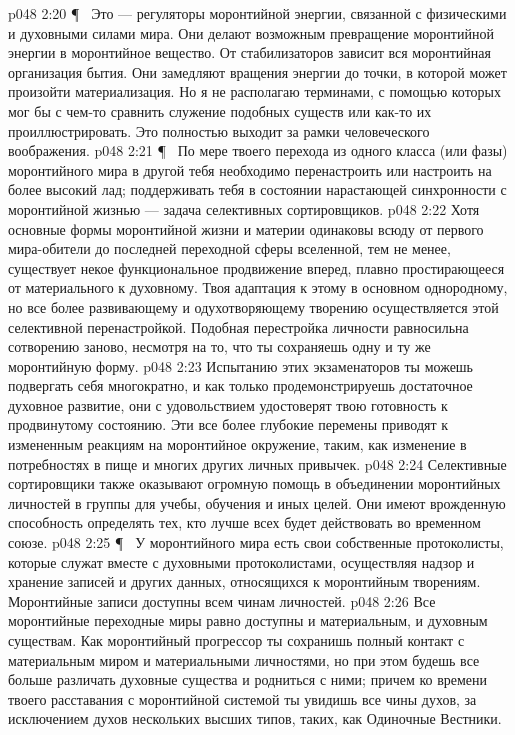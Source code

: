 \vs p048 2:20 \P\ \bibnobreakspace {} Это --- регуляторы моронтийной энергии, связанной с физическими и духовными силами мира. Они делают возможным превращение моронтийной энергии в моронтийное вещество. От стабилизаторов зависит вся моронтийная организация бытия. Они замедляют вращения энергии до точки, в которой может произойти материализация. Но я не располагаю терминами, с помощью которых мог бы с чем\hyp{}то сравнить служение подобных существ или как\hyp{}то их проиллюстрировать. Это полностью выходит за рамки человеческого воображения.
\vs p048 2:21 \P\ \bibnobreakspace {} По мере твоего перехода из одного класса (или фазы) моронтийного мира в другой тебя необходимо перенастроить или настроить на более высокий лад; поддерживать тебя в состоянии нарастающей синхронности с моронтийной жизнью --- задача селективных сортировщиков.
\vs p048 2:22 Хотя основные формы моронтийной жизни и материи одинаковы всюду от первого мира\hyp{}обители до последней переходной сферы вселенной, тем не менее, существует некое функциональное продвижение вперед, плавно простирающееся от материального к духовному. Твоя адаптация к этому в основном однородному, но все более развивающему и одухотворяющему творению осуществляется этой селективной перенастройкой. Подобная перестройка личности равносильна сотворению заново, несмотря на то, что ты сохраняешь одну и ту же моронтийную форму.
\vs p048 2:23 Испытанию этих экзаменаторов ты можешь подвергать себя многократно, и как только продемонстрируешь достаточное духовное развитие, они с удовольствием удостоверят твою готовность к продвинутому состоянию. Эти все более глубокие перемены приводят к измененным реакциям на моронтийное окружение, таким, как изменение в потребностях в пище и многих других личных привычек.
\vs p048 2:24 Селективные сортировщики также оказывают огромную помощь в объединении моронтийных личностей в группы для учебы, обучения и иных целей. Они имеют врожденную способность определять тех, кто лучше всех будет действовать во временном союзе.
\vs p048 2:25 \P\ \bibnobreakspace {} У моронтийного мира есть свои собственные протоколисты, которые служат вместе с духовными протоколистами, осуществляя надзор и хранение записей и других данных, относящихся к моронтийным творениям. Моронтийные записи доступны всем чинам личностей.
\vs p048 2:26 Все моронтийные переходные миры равно доступны и материальным, и духовным существам. Как моронтийный прогрессор ты сохранишь полный контакт с материальным миром и материальными личностями, но при этом будешь все больше различать духовные существа и родниться с ними; причем ко времени твоего расставания с моронтийной системой ты увидишь все чины духов, за исключением духов нескольких высших типов, таких, как Одиночные Вестники.
